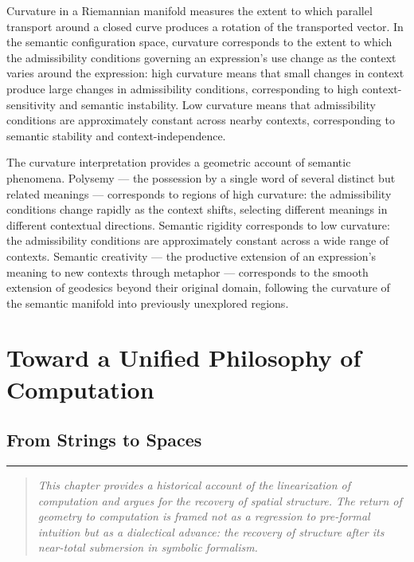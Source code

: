 \documentclass[12pt,openany]{book}
\theoremstyle{plain}
\theoremstyle{definition}
\theoremstyle{remark}
\newcommand{\chapterrule}{%
  \vspace{4pt}%
  {\color{SpherepopBlue}\rule{\textwidth}{0.8pt}}%
  \vspace{10pt}%
}
\newenvironment{chapterprecis}{%
  \begin{quote}\small\itshape}{%
  \end{quote}\medskip}
\begin{document}
Curvature in a Riemannian manifold measures the extent to which parallel transport around a closed curve produces a rotation of the transported vector. In the semantic configuration space, curvature corresponds to the extent to which the admissibility conditions governing an expression's use change as the context varies around the expression: high curvature means that small changes in context produce large changes in admissibility conditions, corresponding to high context-sensitivity and semantic instability. Low curvature means that admissibility conditions are approximately constant across nearby contexts, corresponding to semantic stability and context-independence.

The curvature interpretation provides a geometric account of semantic phenomena. Polysemy — the possession by a single word of several distinct but related meanings — corresponds to regions of high curvature: the admissibility conditions change rapidly as the context shifts, selecting different meanings in different contextual directions. Semantic rigidity corresponds to low curvature: the admissibility conditions are approximately constant across a wide range of contexts. Semantic creativity — the productive extension of an expression's meaning to new contexts through metaphor — corresponds to the smooth extension of geodesics beyond their original domain, following the curvature of the semantic manifold into previously unexplored regions.

 \clearpage

\part{Toward a Unified Philosophy of Computation}

\chapter{From Strings to Spaces}
\chapterrule

\begin{chapterprecis}
This chapter provides a historical account of the linearization
of computation and argues for the recovery of spatial structure.
The return of geometry to computation is framed not as a
regression to pre-formal intuition but as a dialectical advance:
the recovery of structure after its near-total submersion in
symbolic formalism.
\end{chapterprecis}
\end{document}
